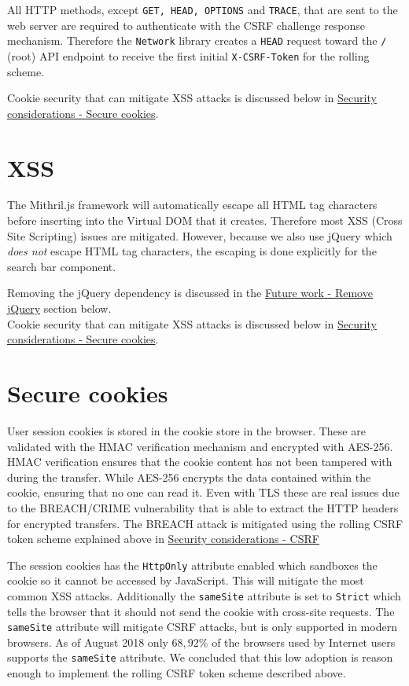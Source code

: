 \documentclass[12pt,a4paper]{report}
\begin{document}
All HTTP methods, except \texttt{GET, HEAD, OPTIONS} and \texttt{TRACE}, that are sent to the web server are required to authenticate with the CSRF challenge response mechanism. Therefore the \texttt{Network} library creates a \texttt{HEAD} request toward the \texttt{/} (root) API endpoint to receive the first initial \texttt{X-CSRF-Token} for the rolling scheme.

Cookie security that can mitigate XSS attacks is discussed below in \hyperref[subsec:secure-cookies]{Security considerations - Secure cookies}.

\section{XSS}
The Mithril.js framework will automatically escape all HTML tag characters before inserting into the Virtual DOM that it creates\cite{mithril-trust}. Therefore most XSS (Cross Site Scripting) issues are mitigated. However, because we also use jQuery which \textit{does not} escape HTML tag characters, the escaping is done explicitly for the search bar component.

Removing the jQuery dependency is discussed in the \hyperref[subsec:remove-jquery]{Future work - Remove jQuery} section below.\\
Cookie security that can mitigate XSS attacks is discussed below in \hyperref[subsec:secure-cookies]{Security considerations - Secure cookies}.

\section{Secure cookies}
\label{subsec:secure-cookies}
User session cookies is stored in the cookie store in the browser. These are validated with the HMAC verification mechanism and encrypted with AES-256. HMAC verification ensures that the cookie content has not been tampered with during the transfer\cite{fips-198}. While AES-256 encrypts the data contained within the cookie, ensuring that no one can read it\cite{fips-197}. Even with TLS these are real issues due to the BREACH/CRIME vulnerability that is able to extract the HTTP headers for encrypted transfers\cite{breach}. The BREACH attack is mitigated using the rolling CSRF token scheme explained above in \hyperref[subsec:csrf]{Security considerations - CSRF}

The session cookies has the \texttt{HttpOnly} attribute enabled which sandboxes the cookie so it cannot be accessed by JavaScript. This will mitigate the most common XSS attacks\cite{owasp-httponly}. Additionally the \texttt{sameSite} attribute is set to \texttt{Strict} which tells the browser that it should not send the cookie with cross-site requests\cite{owasp-samesite}. The \texttt{sameSite} attribute will mitigate CSRF attacks, but is only supported in modern browsers. As of August 2018 only $68,92 \%$ of the browsers used by Internet users supports the \texttt{sameSite} attribute\cite{owasp-samesite-support}. We concluded that this low adoption is reason enough to implement the rolling CSRF token scheme described above.
\end{document}
